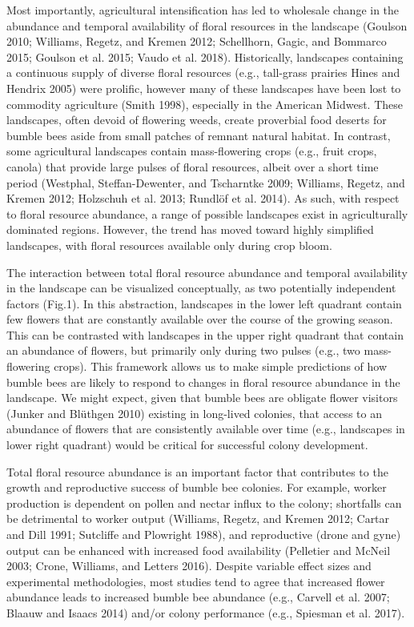 \documentclass[11pt,]{article}
\begin{document}
Most importantly, agricultural intensification has led to wholesale
change in the abundance and temporal availability of floral resources in
the landscape (Goulson 2010; Williams, Regetz, and Kremen 2012;
Schellhorn, Gagic, and Bommarco 2015; Goulson et al. 2015; Vaudo et al.
2018). Historically, landscapes containing a continuous supply of
diverse floral resources (e.g., tall-grass prairies Hines and Hendrix
2005) were prolific, however many of these landscapes have been lost to
commodity agriculture (Smith 1998), especially in the American Midwest.
These landscapes, often devoid of flowering weeds, create proverbial
food deserts for bumble bees aside from small patches of remnant natural
habitat. In contrast, some agricultural landscapes contain
mass-flowering crops (e.g., fruit crops, canola) that provide large
pulses of floral resources, albeit over a short time period (Westphal,
Steffan-Dewenter, and Tscharntke 2009; Williams, Regetz, and Kremen
2012; Holzschuh et al. 2013; Rundlöf et al. 2014). As such, with respect
to floral resource abundance, a range of possible landscapes exist in
agriculturally dominated regions. However, the trend has moved toward
highly simplified landscapes, with floral resources available only
during crop bloom.

The interaction between total floral resource abundance and temporal
availability in the landscape can be visualized conceptually, as two
potentially independent factors (Fig.1). In this abstraction, landscapes
in the lower left quadrant contain few flowers that are constantly
available over the course of the growing season. This can be contrasted
with landscapes in the upper right quadrant that contain an abundance of
flowers, but primarily only during two pulses (e.g., two mass-flowering
crops). This framework allows us to make simple predictions of how
bumble bees are likely to respond to changes in floral resource
abundance in the landscape. We might expect, given that bumble bees are
obligate flower visitors (Junker and Blüthgen 2010) existing in
long-lived colonies, that access to an abundance of flowers that are
consistently available over time (e.g., landscapes in lower right
quadrant) would be critical for successful colony development.

Total floral resource abundance is an important factor that contributes
to the growth and reproductive success of bumble bee colonies. For
example, worker production is dependent on pollen and nectar influx to
the colony; shortfalls can be detrimental to worker output (Williams,
Regetz, and Kremen 2012; Cartar and Dill 1991; Sutcliffe and Plowright
1988), and reproductive (drone and gyne) output can be enhanced with
increased food availability (Pelletier and McNeil 2003; Crone, Williams,
and Letters 2016). Despite variable effect sizes and experimental
methodologies, most studies tend to agree that increased flower
abundance leads to increased bumble bee abundance (e.g., Carvell et al.
2007; Blaauw and Isaacs 2014) and/or colony performance (e.g., Spiesman
et al. 2017).
\end{document}
